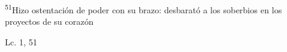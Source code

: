 \documentclass[../../rosario.tex]{subfiles}
\begin{document}
    \textsuperscript{51}Hizo ostentación de poder con su brazo: desbarató a los soberbios en los proyectos de su corazón
    \begin{flushright}
    Lc. 1, 51        
    \end{flushright}
\end{document}
